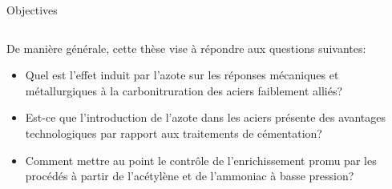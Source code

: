 \documentclass[aspectratio=169,pdf,t]{beamer}
\begin{document}
\begin{frame}{\insertsection}{Objectives}
  \begin{columns}[T]
    \begin{column}{0.7\textwidth}
    De manière générale, cette thèse vise \`a répondre aux questions suivantes:
    \vspace{0.5cm}

    \begin{itemize}
      \def\itemskip{\\[20pt]}
      \item \alert<1->{Quel est l'effet induit par l'azote sur les réponses mécaniques et métallurgiques à la carbonitruration des aciers faiblement alliés?}
      \itemskip
      
      \item \alert<1->{Est-ce que l'introduction de l'azote dans les aciers présente des avantages technologiques par rapport aux traitements de cémentation?}
      \itemskip
      
      \item \alert<2->{Comment mettre au point le contrôle de l'enrichissement promu par les procédés à partir de l'acétylène et de l'ammoniac à basse pression?}
      \itemskip
      

\end{itemize}
\end{column}
\end{columns}
\end{frame}
\end{document}
